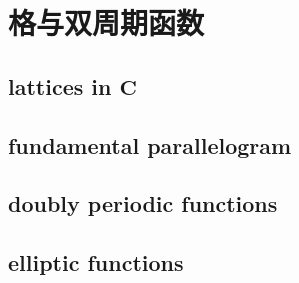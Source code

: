 \section{格与双周期函数}
\label{b3:sec:2201}


\subsection{lattices in \texorpdfstring{\(\mathbf C\)}{m}}
\label{b3:subsec:220101}

\subsection{fundamental parallelogram}
\label{b3:subsec:220102}

\subsection{doubly periodic functions}
\label{b3:subsec:220103}

\subsection{elliptic functions}
\label{b3:subsec:220104}


